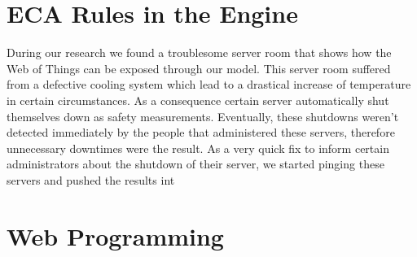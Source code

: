 
\section{ECA Rules in the Engine}
















During our research we found a troublesome server room that shows how the \textrm{Web of Things} can be exposed through our model.
This server room suffered from a defective cooling system which lead to a drastical increase of temperature in certain circumstances.
As a consequence certain server automatically shut themselves down as safety measurements.
Eventually, these shutdowns weren't detected immediately by the people that administered these servers, therefore unnecessary downtimes were the result.
As a very quick fix to inform certain administrators about the shutdown of their server, we started pinging these servers and pushed the results int



\section{Web Programming}


